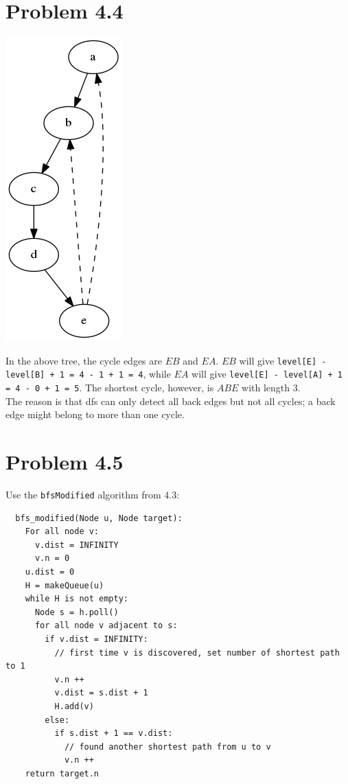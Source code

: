 \documentclass[12pt]{report}
\newcommand{\co}{\texttt}
\begin{document}
\section{Problem 4.4}
\begin{center} \includegraphics{dfs_fail.png} \end{center}
In the above tree, the cycle edges are $EB$ and $EA$. $EB$ will give \co{level[E] - level[B] + 1 = 4 - 1 + 1 = 4}, while $EA$ will give \co{level[E] - level[A] + 1 = 4 - 0 + 1 = 5}. The shortest cycle, however, is $ABE$ with length $3$. \\
The reason is that dfs can only detect all back edges but not all cycles; a back edge might belong to more than one cycle.

\section{Problem 4.5}
Use the \co{bfsModified} algorithm from 4.3:
\begin{lstlisting}
  bfs_modified(Node u, Node target):
    For all node v:
      v.dist = INFINITY
      v.n = 0
    u.dist = 0
    H = makeQueue(u)
    while H is not empty:
      Node s = h.poll()
      for all node v adjacent to s:
        if v.dist = INFINITY:
          // first time v is discovered, set number of shortest path to 1
          v.n ++
          v.dist = s.dist + 1
          H.add(v)
        else:
          if s.dist + 1 == v.dist:
            // found another shortest path from u to v
            v.n ++
    return target.n
\end{lstlisting}
\end{document}
